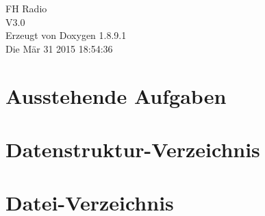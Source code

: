 \documentclass[twoside]{book}
\newcommand{\+}{\discretionary{\mbox{\scriptsize$\hookleftarrow$}}{}{}}
\newcommand{\clearemptydoublepage}{%
  \newpage{\pagestyle{empty}\cleardoublepage}%
}
\begin{document}
\hypersetup{pageanchor=false,
             bookmarks=true,
             bookmarksnumbered=true,
             pdfencoding=unicode
            }
\begin{titlepage}
\vspace*{7cm}
\begin{center}%
{\Large F\+H Radio \\[1ex]\large V3.\+0 }\\
\vspace*{1cm}
{\large Erzeugt von Doxygen 1.8.9.1}\\
\vspace*{0.5cm}
{\small Die Mär 31 2015 18:54:36}\\
\end{center}
\end{titlepage}
\clearemptydoublepage
\tableofcontents
\clearemptydoublepage
{}
\hypersetup{pageanchor=true}

\chapter{Ausstehende Aufgaben}
\label{todo}
\hypertarget{todo}{}

\chapter{Datenstruktur-\/\+Verzeichnis}

\chapter{Datei-\/\+Verzeichnis}

\end{document}
